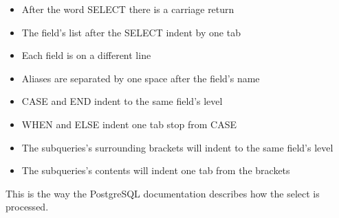 \begin{itemize}
 \item After the word SELECT there is a carriage return
 \item The field's list after the SELECT indent by one tab
 \item Each field is on a different line 
 \item Aliases are separated by one space after the field's name
 \item CASE and END indent to the same field's level
 \item WHEN and ELSE indent one tab stop from CASE
 \item The subqueries's surrounding brackets will indent to the same field's level
 \item The subqueries's contents will indent one tab from the brackets
 
\end{itemize}






This is the way the PostgreSQL documentation describes how the select is processed.

